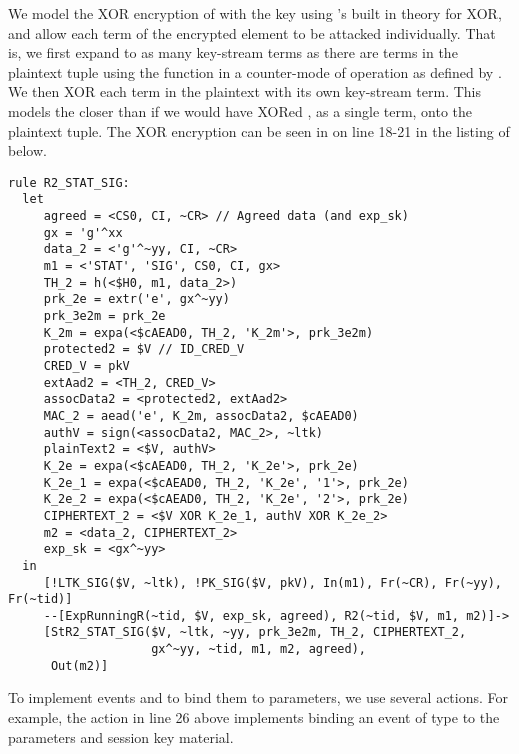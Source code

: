 %
We model the XOR encryption of  with the key  using
\mTamarin{}'s built in theory for XOR, and allow each term of the encrypted
element to be attacked individually.
%
That is, we first expand  to as many key-stream terms as there are
terms in the plaintext tuple using the \mHkdfExpand{} function in a counter-mode
of operation as defined by \mEdhoc{}.
%
We then XOR each term in the plaintext with its own key-stream term.
%
This models the \mSpec{} closer than if we would have XORed , as a
single term, onto the plaintext tuple.
%
The XOR encryption can be seen in on line 18-21 in the listing of
 below.
%
%
\begin{lstlisting}
rule R2_STAT_SIG:
  let
     agreed = <CS0, CI, ~CR> // Agreed data (and exp_sk)
     gx = 'g'^xx
     data_2 = <'g'^~yy, CI, ~CR>
     m1 = <'STAT', 'SIG', CS0, CI, gx>
     TH_2 = h(<$H0, m1, data_2>)
     prk_2e = extr('e', gx^~yy)
     prk_3e2m = prk_2e
     K_2m = expa(<$cAEAD0, TH_2, 'K_2m'>, prk_3e2m)
     protected2 = $V // ID_CRED_V
     CRED_V = pkV
     extAad2 = <TH_2, CRED_V>
     assocData2 = <protected2, extAad2>
     MAC_2 = aead('e', K_2m, assocData2, $cAEAD0)
     authV = sign(<assocData2, MAC_2>, ~ltk)
     plainText2 = <$V, authV>
     K_2e = expa(<$cAEAD0, TH_2, 'K_2e'>, prk_2e)
     K_2e_1 = expa(<$cAEAD0, TH_2, 'K_2e', '1'>, prk_2e)
     K_2e_2 = expa(<$cAEAD0, TH_2, 'K_2e', '2'>, prk_2e)
     CIPHERTEXT_2 = <$V XOR K_2e_1, authV XOR K_2e_2>
     m2 = <data_2, CIPHERTEXT_2>
     exp_sk = <gx^~yy>
  in
     [!LTK_SIG($V, ~ltk), !PK_SIG($V, pkV), In(m1), Fr(~CR), Fr(~yy), Fr(~tid)]
     --[ExpRunningR(~tid, $V, exp_sk, agreed), R2(~tid, $V, m1, m2)]->
     [StR2_STAT_SIG($V, ~ltk, ~yy, prk_3e2m, TH_2, CIPHERTEXT_2,
                    gx^~yy, ~tid, m1, m2, agreed),
      Out(m2)]
\end{lstlisting}
%

To implement events and
to bind them to parameters, we use several \mTamarin{} actions.
%
For example, the action  in line 26
above implements binding an event of type \mRStart{} to the parameters and session key
material.%
%

